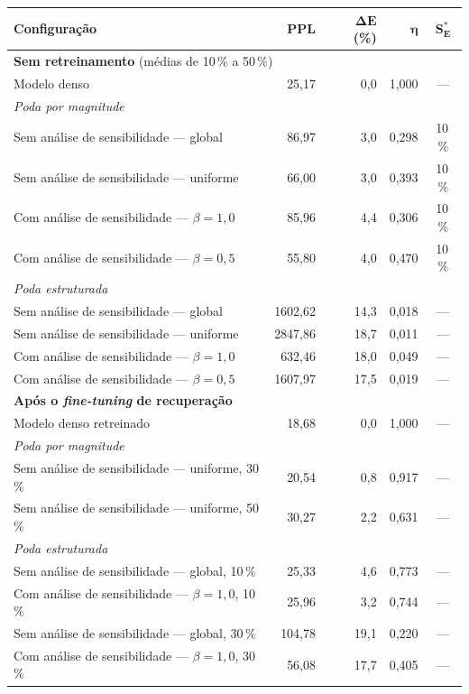 \begin{tabular}{l r r r c}
\toprule
\textbf{Configuração} & \textbf{PPL} & $\boldsymbol{\Delta E}$ \textbf{(\%)} & $\boldsymbol{\eta}$ & $\boldsymbol{S^*_E}$ \\
\midrule
\multicolumn{5}{l}{\textbf{Sem retreinamento} (médias de 10\,\% a 50\,\%)} \\
Modelo denso & 25,17 & 0,0 & 1,000 & --- \\
\multicolumn{5}{l}{\quad\textit{Poda por magnitude}} \\
\qquad Sem análise de sensibilidade --- global & 86,97 & 3,0 & 0,298 & 10\,\% \\
\qquad Sem análise de sensibilidade --- uniforme & 66,00 & 3,0 & 0,393 & 10\,\% \\
\qquad Com análise de sensibilidade --- $\beta = 1{,}0$ & 85,96 & 4,4 & 0,306 & 10\,\% \\
\qquad Com análise de sensibilidade --- $\beta = 0{,}5$ & 55,80 & 4,0 & 0,470 & 10\,\% \\
\multicolumn{5}{l}{\quad\textit{Poda estruturada}} \\
\qquad Sem análise de sensibilidade --- global & 1602,62 & 14,3 & 0,018 & --- \\
\qquad Sem análise de sensibilidade --- uniforme & 2847,86 & 18,7 & 0,011 & --- \\
\qquad Com análise de sensibilidade --- $\beta = 1{,}0$ & 632,46 & 18,0 & 0,049 & --- \\
\qquad Com análise de sensibilidade --- $\beta = 0{,}5$ & 1607,97 & 17,5 & 0,019 & --- \\
\midrule
\multicolumn{5}{l}{\textbf{Após o \textit{fine-tuning} de recuperação}} \\
Modelo denso retreinado & 18,68 & 0,0 & 1,000 & --- \\
\multicolumn{5}{l}{\quad\textit{Poda por magnitude}} \\
\qquad Sem análise de sensibilidade --- uniforme, 30\,\% & 20,54 & 0,8 & 0,917 & --- \\
\qquad Sem análise de sensibilidade --- uniforme, 50\,\% & 30,27 & 2,2 & 0,631 & --- \\
\multicolumn{5}{l}{\quad\textit{Poda estruturada}} \\
\qquad Sem análise de sensibilidade --- global, 10\,\% & 25,33 & 4,6 & 0,773 & --- \\
\qquad Com análise de sensibilidade --- $\beta = 1{,}0$, 10\,\% & 25,96 & 3,2 & 0,744 & --- \\
\qquad Sem análise de sensibilidade --- global, 30\,\% & 104,78 & 19,1 & 0,220 & --- \\
\qquad Com análise de sensibilidade --- $\beta = 1{,}0$, 30\,\% & 56,08 & 17,7 & 0,405 & --- \\
\bottomrule
\end{tabular}

